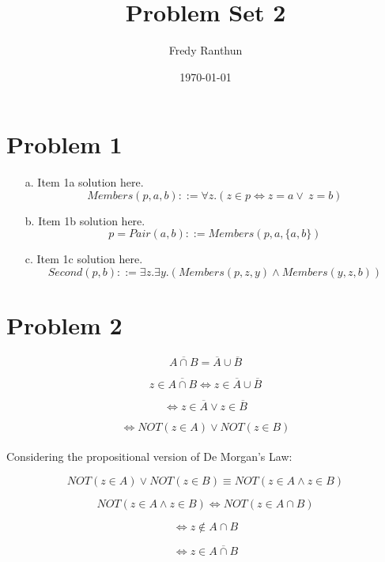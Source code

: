 \documentclass{article}
\begin{document}
\title{Problem Set 2}
\author{Fredy Ranthun}
\date{\today}

\maketitle

\section*{Problem 1}

\begin{enumerate}
  \item[a.] Item 1a solution here.
        \[
          Members(p,a,b) ::= \forall z.(z \in p \iff z = a \lor \ z = b)
        \]
  \item[b.] Item 1b solution here.
        \[
          p = Pair(a,b) ::= Members(p, a, \{a, b\})
        \]
  \item[c.] Item 1c solution here.
        \[
          Second(p,b) ::= \exists z. \exists y.(Members(p,z,y) \land Members(y,z,b))
        \]
\end{enumerate}

\section*{Problem 2}

\[
  \overline{A \cap B} = \overline{A} \cup \overline{B}
\]

\[
  z \in \overline{A \cap B} \iff z \in \overline{A} \cup \overline{B}
\]

\[
  \iff z \in \overline{A} \lor z \in \overline{B}
\]

\[
  \iff NOT (z \in {A}) \lor NOT (z \in {B})
\]

\paragraph{}
Considering the propositional version of De Morgan’s Law:

\[
  NOT (z \in {A}) \lor NOT (z \in {B}) \equiv NOT(z \in {A} \land z \in {B})
\]

\[
  NOT(z \in {A} \land z \in {B}) \iff NOT(z \in {A} \cap {B})
\]

\[
  \iff z \notin {A} \cap {B}
\]

\[
  \iff z \in \overline{A \cap B}
\]
\end{document}
